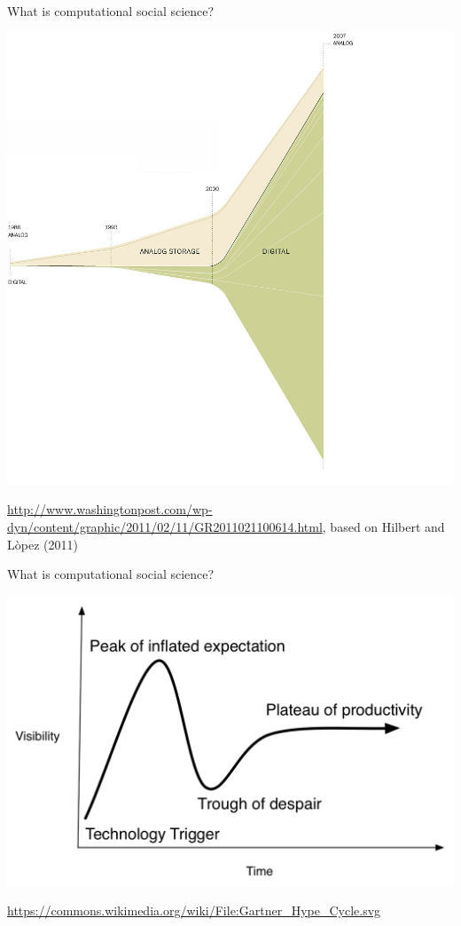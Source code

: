 \documentclass{beamer}
\def\vf{\vfill}
\begin{document}
\begin{frame}{What is computational social science?}

\begin{center}
\includegraphics[height=0.8\textheight]{figures/digital_age_clean.png}
\end{center}

\vf
\tiny{\url{http://www.washingtonpost.com/wp-dyn/content/graphic/2011/02/11/GR2011021100614.html}, based on Hilbert and L\`{o}pez (2011)}

\end{frame}
\begin{frame}{What is computational social science?}

\begin{center}
\includegraphics[width=\textwidth]{figures/hype_cycle}
\end{center}

\vf
\tiny{\url{https://commons.wikimedia.org/wiki/File:Gartner_Hype_Cycle.svg}}

\end{frame}
\end{document}
